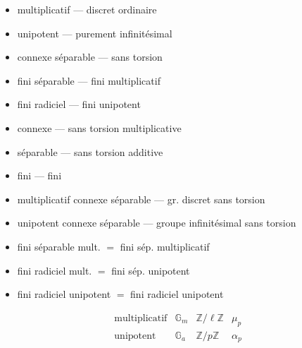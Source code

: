 \documentclass[11pt,a4paper]{article}
\begin{document}
\begin{itemize}
\item multiplicatif --- discret ordinaire
\item unipotent --- purement infinitésimal
\end{itemize}

\begin{itemize}
\item connexe séparable ---  sans torsion
\item fini séparable --- fini multiplicatif
\item fini radiciel --- fini unipotent
\end{itemize}

\begin{itemize}
\item {} connexe --- sans torsion multiplicative
\item séparable --- sans torsion additive
\item fini --- fini
\end{itemize}

\begin{itemize}
\item multiplicatif connexe séparable --- gr. discret sans torsion
\item unipotent connexe séparable --- groupe infinitésimal
 sans torsion \marginal{(= \struck{\ill{}} \ill{})}
\item fini séparable mult.  $=$ fini sép.
multiplicatif
\item fini radiciel mult. $=$ fini sép. unipotent
\item fini radiciel unipotent $=$ fini radiciel unipotent
\end{itemize}

\[
\begin{array}{c|c|c|c}
\text{multiplicatif} & \mathbb{G}_m & \mathbb{Z}/\ell\mathbb{Z} & \mu_p \\ \hline
\text{unipotent} & \mathbb{G}_a & \mathbb{Z}/p\mathbb{Z} & \alpha_p
\end{array}
\]
\end{document}
